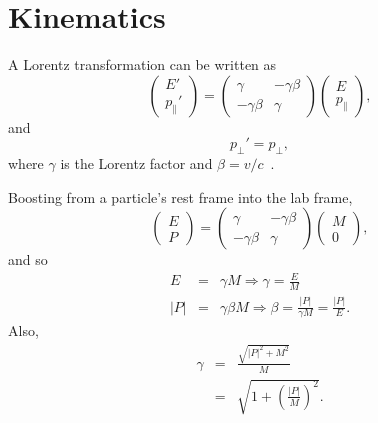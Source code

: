 \chapter{Kinematics}
\label{app:kinematics}
A Lorentz transformation can be written as
\begin{equation}
\left(\begin{array}{c} E' \\ p_{\parallel}' \end{array} \right)
=
\left(
\begin{array}{cc}
\gamma & -\gamma\beta \\
-\gamma\beta & \gamma
\end{array}
\right)
\left (\begin{array}{c} E \\ p_{\parallel} \end{array}\right),
\end{equation}
and
\begin{equation}
p_{\perp}' = p_{\perp},
\end{equation}
where $\gamma$ is the Lorentz factor and $\beta=v/c$~\cite{pdg}.

Boosting from a particle's rest frame into the lab frame,
\begin{equation}
\left(\begin{array}{c} E \\ P \end{array} \right)
=
\left(
\begin{array}{cc}
\gamma & -\gamma\beta \\
-\gamma\beta & \gamma
\end{array}
\right)
\left (\begin{array}{c} M \\ 0 \end{array}\right),
\end{equation}
and so
\begin{eqnarray*}
E &=& \gamma M  \Longrightarrow \gamma = \frac{E}{M} \\
|P| &=& \gamma\beta M \Longrightarrow \beta = \frac{|P|}{\gamma M} = \frac{|P|}{E}.
\end{eqnarray*}
Also,
\begin{eqnarray*}
\gamma &=& \frac{\sqrt{|P|^2 + M^2}}{M} \\
&=& \sqrt{1 +\left(\frac{|P|}{M}\right)^2}.
\end{eqnarray*}
